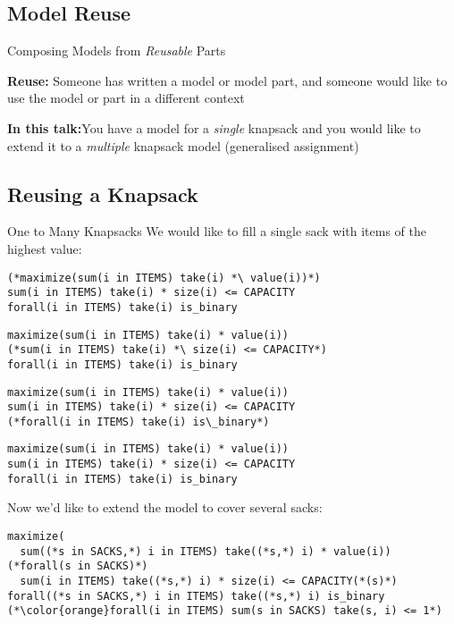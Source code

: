 \documentclass[smaller,handout]{beamer}
\begin{document}
\subsection{Model Reuse}
\begin{frame}{Composing Models from \emph{Reusable} Parts}


  {\bf Reuse:} Someone has written a model or model part,
  and someone would like to use the model or part in a different context

  {\bf In this talk:}You have a model for a \emph{single} knapsack
  and you would like to extend it to a \emph{multiple} knapsack model (generalised assignment)
\end{frame}


\subsection{Reusing a Knapsack}
\begin{frame}[fragile]{One to Many Knapsacks}
  We would like to fill a single sack with items of the highest value:
  \vspace{-2ex}
  \begin{overprint}
  \begin{lstlisting}[style=mosel]
(*maximize(sum(i in ITEMS) take(i) *\ value(i))*)
sum(i in ITEMS) take(i) * size(i) <= CAPACITY
forall(i in ITEMS) take(i) is_binary
  \end{lstlisting}

  \begin{lstlisting}[style=mosel]
maximize(sum(i in ITEMS) take(i) * value(i))
(*sum(i in ITEMS) take(i) *\ size(i) <= CAPACITY*)
forall(i in ITEMS) take(i) is_binary
  \end{lstlisting}

  \begin{lstlisting}[style=mosel]
maximize(sum(i in ITEMS) take(i) * value(i))
sum(i in ITEMS) take(i) * size(i) <= CAPACITY
(*forall(i in ITEMS) take(i) is\_binary*)
\end{lstlisting}

  \begin{lstlisting}[style=mosel]
maximize(sum(i in ITEMS) take(i) * value(i))
sum(i in ITEMS) take(i) * size(i) <= CAPACITY
forall(i in ITEMS) take(i) is_binary
  \end{lstlisting}
  \vspace{2ex}

  Now we'd like to extend the model to cover several sacks:
  \begin{lstlisting}[style=mosel]
maximize(
  sum((*s in SACKS,*) i in ITEMS) take((*s,*) i) * value(i))
(*forall(s in SACKS)*)
  sum(i in ITEMS) take((*s,*) i) * size(i) <= CAPACITY(*(s)*)
forall((*s in SACKS,*) i in ITEMS) take((*s,*) i) is_binary
(*\color{orange}forall(i in ITEMS) sum(s in SACKS) take(s, i) <= 1*)
\end{lstlisting}
  \end{overprint}
\end{frame}
\end{document}
